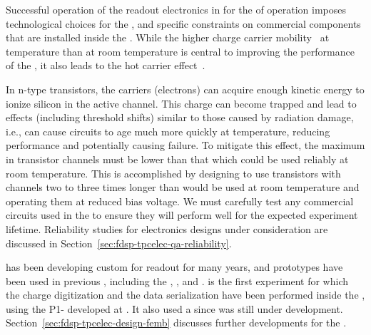 Successful operation of the readout electronics in  for the 
\dunelifetime %
of  operation %
imposes technological choices %
for the  ,  %
and specific constraints on commercial components that are installed
inside the . While the higher charge carrier 
mobility~\cite{Hairapetian1989} at  temperature than at room
temperature is central to improving the performance of the  , it also leads
to the hot carrier effect~\cite{Hot-electron}. 

In n-type  transistors, the carriers (electrons)
can acquire enough kinetic energy to ionize silicon in the active channel. This
charge can become trapped and lead to effects (including threshold shifts)
similar to those caused by radiation damage, i.e., %
can cause 
circuits to age much more quickly at  temperature, %
reducing performance and potentially causing failure. To mitigate this effect,
the maximum \efield in transistor channels must be lower than %
that which could %
be used reliably at room temperature. 
%
This is accomplished by designing  to use transistors 
with  channels two to three times longer than would be used at room temperature
and operating them at reduced bias voltage. 
%
We must carefully test any commercial circuits used in the  %
to ensure 
they will perform well for the expected experiment lifetime. %
Reliability studies for  electronics designs under %
consideration are 
discussed in Section~\ref{sec:fdsp-tpcelec-qa-reliability}.

 has been developing custom  for  readout %
for many years, and %
 prototypes have been used in previous , 
including the , , and .  is the first
experiment for which the charge digitization %
and the data serialization
have been performed inside the , using the P1-  
developed at . %
It also used a  since  was
still under development. %
Section~\ref{sec:fdsp-tpcelec-design-femb} discusses further  developments for the .

